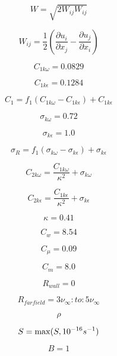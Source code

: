 \begin{equation}
W = \sqrt{2 W_{ij} W_{ij} }
\end{equation}

\begin{equation}
W_{ij} = \frac{1}{2} \left( \frac{\partial u_i}{\partial x_j} -
\frac{\partial u_j}{\partial x_i} \right)
\end{equation}

\begin{equation}
C_{1k\omega}=0.0829
\end{equation}

\begin{equation}
C_{1k\epsilon}=0.1284
\end{equation}

\begin{equation}
C_1 = f_1(C_{1k\omega} - C_{1k\epsilon}) + C_{1k\epsilon}
\end{equation}

\begin{equation}
\sigma_{k \omega} = 0.72
\end{equation}

\begin{equation}
\sigma_{k \epsilon} = 1.0
\end{equation}

\begin{equation}
\sigma_R = f_1(\sigma_{k \omega} - \sigma_{k \epsilon}) + \sigma_{k \epsilon}
\end{equation}

\begin{equation}
C_{2k\omega} = \frac{C_{1k\omega}}{\kappa^2} + \sigma_{k \omega}
\end{equation}

\begin{equation}
C_{2k\epsilon} = \frac{C_{1k\epsilon}}{\kappa^2} + \sigma_{k \epsilon}
\end{equation}

\begin{equation}
\kappa = 0.41
\end{equation}

\begin{equation}
C_w = 8.54
\end{equation}

\begin{equation}
C_{\mu} = 0.09
\end{equation}

\begin{equation}
C_m = 8.0
\end{equation}

\begin{equation}
R_{wall} = 0
\end{equation}

\begin{equation}
R_{farfield} = 3 \nu_{\infty} : to : 5 \nu_{\infty}
\end{equation}

\begin{equation}
\rho
\end{equation}

\begin{equation}
S = {\rm max}(S,10^{-16} s^{-1})
\end{equation}

\begin{equation}
B=1
\end{equation}


